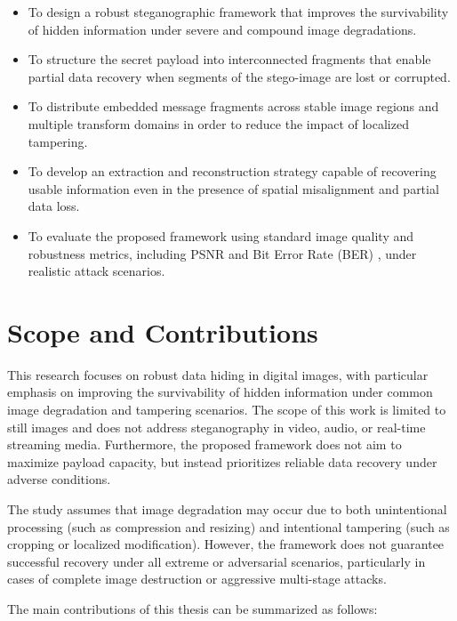 \documentclass[12pt,a4paper,oneside]{report}
\begin{document}
	\begin{itemize}
		\item To design a robust steganographic framework that improves the survivability of hidden information under severe and compound image degradations.
		
		\item To structure the secret payload into interconnected fragments that enable partial data recovery when segments of the stego-image are lost or corrupted.
		
		\item To distribute embedded message fragments across stable image regions and multiple transform domains in order to reduce the impact of localized tampering.
		
		\item To develop an extraction and reconstruction strategy capable of recovering usable information even in the presence of spatial misalignment and partial data loss.
		
		\item To evaluate the proposed framework using standard image quality and robustness metrics, including PSNR \cite{gonzalez2008digital} and Bit Error Rate (BER) \cite{proakis2008digital}, under realistic attack scenarios.
	\end{itemize}
	
	\section{Scope and Contributions}
	
	This research focuses on robust data hiding in digital images, with particular emphasis on improving the survivability of hidden information under common image degradation and tampering scenarios. The scope of this work is limited to still images and does not address steganography in video, audio, or real-time streaming media. Furthermore, the proposed framework does not aim to maximize payload capacity, but instead prioritizes reliable data recovery under adverse conditions.
	
	The study assumes that image degradation may occur due to both unintentional processing (such as compression and resizing) and intentional tampering (such as cropping or localized modification). However, the framework does not guarantee successful recovery under all extreme or adversarial scenarios, particularly in cases of complete image destruction or aggressive multi-stage attacks.
	
	The main contributions of this thesis can be summarized as follows:
	
\end{document}
